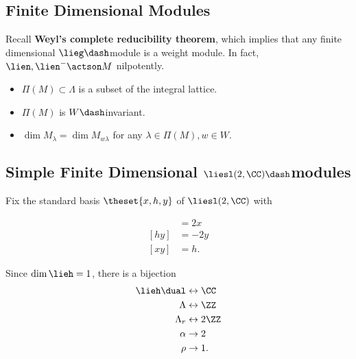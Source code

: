 \hypertarget{finite-dimensional-modules}{%
\subsection{Finite Dimensional
Modules}\label{finite-dimensional-modules}}

Recall \textbf{Weyl's complete reducibility theorem}, which implies that
any finite dimensional \(\lieg\dash\)module is a weight module. In fact,
\(\lien, \lien^- \actson M\) nilpotently.

\begin{fact}

\envlist

\begin{itemize}
\tightlist
\item
  \(\Pi(M) \subset \Lambda\) is a subset of the integral lattice.
\item
  \(\Pi(M)\) is \(W\dash\)invariant.
\item
  \(\dim M_\lambda = \dim M_{w\lambda}\) for any
  \(\lambda \in \Pi(M), w\in W\).
\end{itemize}

\end{fact}

\hypertarget{simple-finite-dimensional-liesl2-ccdashmodules}{%
\subsection{\texorpdfstring{Simple Finite Dimensional
\(\liesl(2, \CC)\dash\)modules}{Simple Finite Dimensional \textbackslash liesl(2, \textbackslash CC)\textbackslash dashmodules}}\label{simple-finite-dimensional-liesl2-ccdashmodules}}

Fix the standard basis \(\theset{x, h, y}\) of \(\liesl(2, \CC)\) with

\begin{align*}  
[h x] &= 2x \\
[h y] &= -2y \\
[x y] &= h
.\end{align*}

Since \(\dim \lieh = 1\), there is a bijection
\begin{align*}  
\lieh\dual &\leftrightarrow \CC \\
\Lambda &\leftrightarrow \ZZ \\
\Lambda_r &\leftrightarrow 2\ZZ  \\
\alpha &\to 2\\
\rho &\to 1
.\end{align*}

